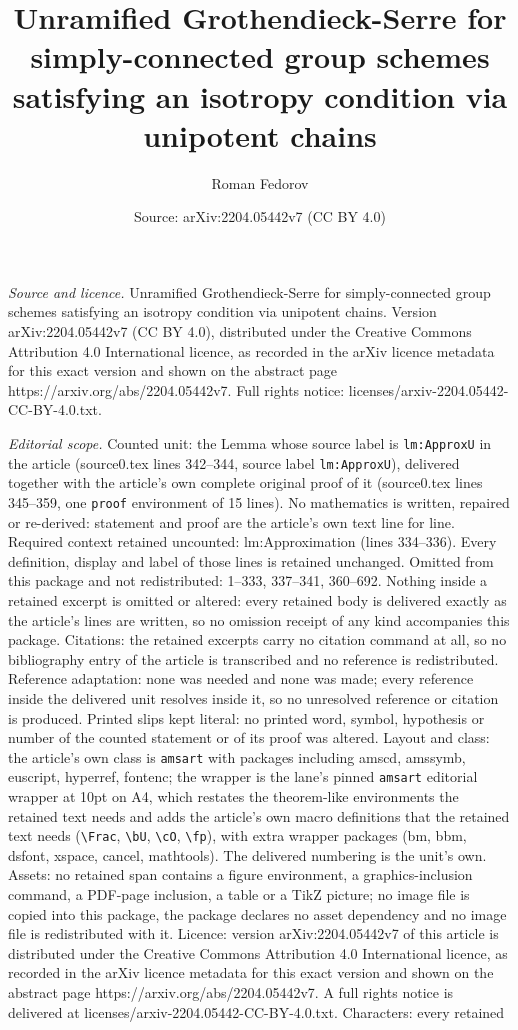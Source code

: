 \documentclass[10pt,a4paper]{amsart}
\title[Unramified Grothendieck-Serre for simply-connected group sch]{Unramified Grothendieck-Serre for simply-connected group schemes satisfying an isotropy condition via unipotent chains}
\author{Roman Fedorov}
\date{Source: arXiv:2204.05442v7 (CC BY 4.0)}
\begin{document}
\maketitle

\noindent\emph{Source and licence.} Unramified Grothendieck-Serre for simply-connected group schemes satisfying an isotropy condition via unipotent chains. Version arXiv:2204.05442v7 (CC BY 4.0), distributed under the Creative Commons Attribution 4.0 International licence, as recorded in the arXiv licence metadata for this exact version and shown on the abstract page https://arxiv.org/abs/2204.05442v7. Full rights notice: licenses/arxiv-2204.05442-CC-BY-4.0.txt.\par\smallskip

\noindent\textit{Editorial scope.} Counted unit: the Lemma whose source label is \texttt{lm:ApproxU} in the article (source0.tex lines 342--344, source label \texttt{lm:ApproxU}), delivered together with the article's own complete original proof of it (source0.tex lines 345--359, one \texttt{proof} environment of 15 lines). No mathematics is written, repaired or re-derived: statement and proof are the article's own text line for line. Required context retained uncounted: lm:Approximation (lines 334--336). Every definition, display and label of those lines is retained unchanged. Omitted from this package and not redistributed: 1--333, 337--341, 360--692. Nothing inside a retained excerpt is omitted or altered: every retained body is delivered exactly as the article's lines are written, so no omission receipt of any kind accompanies this package. Citations: the retained excerpts carry no citation command at all, so no bibliography entry of the article is transcribed and no reference is redistributed. Reference adaptation: none was needed and none was made; every reference inside the delivered unit resolves inside it, so no unresolved reference or citation is produced. Printed slips kept literal: no printed word, symbol, hypothesis or number of the counted statement or of its proof was altered. Layout and class: the article's own class is \texttt{amsart} with packages including amscd, amssymb, euscript, hyperref, fontenc; the wrapper is the lane's pinned \texttt{amsart} editorial wrapper at 10pt on A4, which restates the theorem-like environments the retained text needs and adds the article's own macro definitions that the retained text needs (\texttt{\textbackslash Frac}, \texttt{\textbackslash bU}, \texttt{\textbackslash cO}, \texttt{\textbackslash fp}), with extra wrapper packages (bm, bbm, dsfont, xspace, cancel, mathtools). The delivered numbering is the unit's own. Assets: no retained span contains a figure environment, a graphics-inclusion command, a PDF-page inclusion, a table or a TikZ picture; no image file is copied into this package, the package declares no asset dependency and no image file is redistributed with it. Licence: version arXiv:2204.05442v7 of this article is distributed under the Creative Commons Attribution 4.0 International licence, as recorded in the arXiv licence metadata for this exact version and shown on the abstract page https://arxiv.org/abs/2204.05442v7. A full rights notice is delivered at licenses/arxiv-2204.05442-CC-BY-4.0.txt. Characters: every retained 
\end{document}
